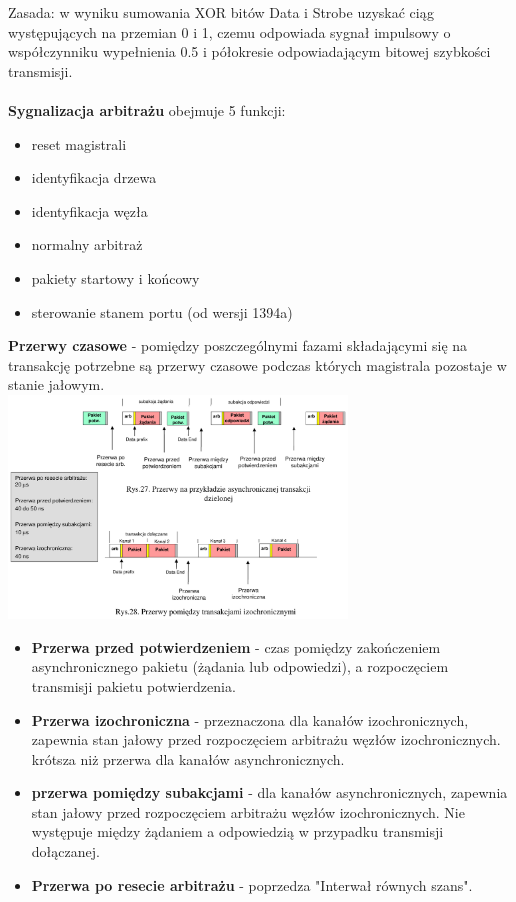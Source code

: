 Zasada: w wyniku sumowania XOR bitów Data i Strobe uzyskać ciąg występujących na przemian 0 i 1, czemu odpowiada sygnał impulsowy o współczynniku wypełnienia 0.5 i półokresie odpowiadającym bitowej szybkości transmisji.\\\\
\textbf{Sygnalizacja arbitrażu} obejmuje 5 funkcji:
\begin{itemize}
	\item reset magistrali
	\item identyfikacja drzewa
	\item identyfikacja węzła
	\item normalny arbitraż
	\item pakiety startowy i końcowy
	\item sterowanie stanem portu (od wersji 1394a)
\end{itemize}
\textbf{Przerwy czasowe} - pomiędzy poszczególnymi fazami składającymi się na transakcję potrzebne są przerwy czasowe podczas których magistrala pozostaje w stanie jałowym.\\
\includegraphics[width=9cm]{./wyklady/FIREWIRE_29_1.pdf}\\
\begin{itemize}
	\item \textbf{Przerwa przed potwierdzeniem} - czas pomiędzy zakończeniem asynchronicznego pakietu (żądania lub odpowiedzi), a rozpoczęciem transmisji pakietu potwierdzenia.
	\item \textbf{Przerwa izochroniczna} - przeznaczona dla kanałów izochronicznych, zapewnia stan jałowy przed rozpoczęciem arbitrażu węzłów izochronicznych. krótsza niż przerwa dla kanałów asynchronicznych.
	\item \textbf{przerwa pomiędzy subakcjami} - dla kanałów asynchronicznych, zapewnia stan jałowy przed rozpoczęciem arbitrażu węzłów izochronicznych. Nie występuje między żądaniem a odpowiedzią w przypadku transmisji dołączanej.
	\item \textbf{Przerwa po resecie arbitrażu} - poprzedza "Interwał równych szans".
\end{itemize}

